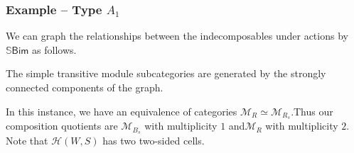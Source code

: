 \documentclass{beamer}
\newcommand{\textcat}[1]{\mathrm{\textsf{#1}}}
\begin{document}
\begin{frame}
\frametitle{Example -- Type $A_1$}
\noindent We can graph the relationships between the indecomposables under actions by $\mathbb{S}\textcat{Bim}$ as follows.\vspace{-0.5cm}
\begin{center}
\end{center}
\vspace{-1.5cm}\noindent The simple transitive module subcategories are generated by the strongly connected components of the graph.\newline

\noindent In this instance, we have an equivalence of categories $\mathcal{M}_R \simeq \mathcal{M}_{R_s}$.\newline Thus our composition quotients are \textcolor{structure}{$\mathcal{M}_{B_s}$ with multiplicity $1$} and\newline \textcolor{structure}{$\mathcal{M}_R$ with multiplicity $2$}. Note that $\mathscr{H}(W, S)$ has two two-sided cells.
\end{frame}
\end{document}
